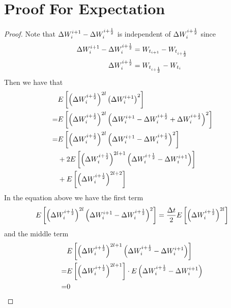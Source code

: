 \documentclass{homework}
\begin{document}
    \problem

    \appendix
    \section{Proof For Expectation}
    \label{sec:proof for expectation}
    \begin{proof}
        Note that $\Delta W_{i}^{i+1}-\Delta W_{i}^{i+\frac{1}{2}}$ is independent of $\Delta W_{i}^{i+\frac{1}{2}}$ 
        since
        \[\begin{aligned}
            \Delta W_{i}^{i+1}-\Delta W_{i}^{i+\frac{1}{2}}&=W_{t_{i+1}}-W_{t_{i+\frac{1}{2}}}\\
            \Delta W_{i}^{i+\frac{1}{2}}&=W_{t_{i+\frac{1}{2}}}-W_{t_i}
        \end{aligned}\]
        Then we have that
        \[\begin{aligned}
            &E\left[
            \left(\Delta W_{i}^{i+\frac{1}{2}}\right)^{2l}
            \left(\Delta W_{i}^{i+1}\right)^2
            \right]\\
            =&E\left[
            \left(\Delta W_{i}^{i+\frac{1}{2}}\right)^{2l}
            \left(\Delta W_{i}^{i+1}-\Delta W_{i}^{i+\frac{1}{2}}+\Delta W_{i}^{i+\frac{1}{2}}\right)^2
            \right]\\
            =&\begin{aligned}[t]
            &E\left[
            \left(\Delta W_{i}^{i+\frac{1}{2}}\right)^{2l}\left(\Delta W_{i}^{i+1}-\Delta W_{i}^{i+\frac{1}{2}}\right)^2
            \right]\\
            &+2E\left[
            \left(\Delta W_{i}^{i+\frac{1}{2}}\right)^{2l+1}\left(\Delta W_{i}^{i+\frac{1}{2}}-\Delta W_{i}^{i+1}\right)
            \right]\\
            &+E\left[\left(\Delta W_{i}^{i+\frac{1}{2}}\right)^{2l+2}\right]\\
            \end{aligned}\\
        \end{aligned}\]
        In the equation above we have the first term
        \[\begin{aligned}
            E\left[
            \left(\Delta W_{i}^{i+\frac{1}{2}}\right)^{2l}\left(\Delta W_{i}^{i+1}-\Delta W_{i}^{i+\frac{1}{2}}\right)^2
            \right]
            =\frac{\Delta t}{2}E\left[\left(\Delta W_{i}^{i+\frac{1}{2}}\right)^{2l}\right]
        \end{aligned}\]
        and the middle term
        \[\begin{aligned}
            &E\left[\left(\Delta W_{i}^{i+\frac{1}{2}}\right)^{2l+1}\left(\Delta W_{i}^{i+\frac{1}{2}}-\Delta W_{i}^{i+1}\right)\right]\\
            =&
            E\left[\left(\Delta W_{i}^{i+\frac{1}{2}}\right)^{2l+1}\right]
            \cdot E\left(\Delta W_{i}^{i+\frac{1}{2}}-\Delta W_{i}^{i+1}\right)\\
            =&0\\
        \end{aligned}\]

\end{proof}
\end{document}
